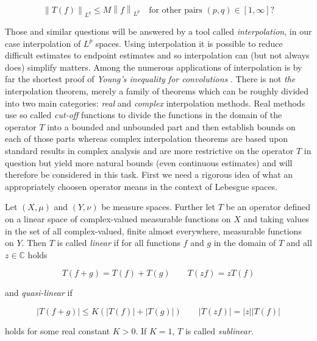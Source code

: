 \begin{equation*}
	\left\| T(f)\right\|_{L^q} \leq M \left\| f\right\|_{L^p} \quad \text{for other pairs $\left( p,q \right) \in [1,\infty]$?} 
\end{equation*}

Those and similar questions will be answered by a tool called \emph{interpolation}, in our case interpolation of $L^p$ spaces. Using interpolation it is possible to reduce difficult estimates to endpoint estimates and so interpolation can (but not always does) simplify matters. Among the numerous applications of interpolation is by far the shortest proof of \emph{Young's inequality for convolutions} \textup{\cite[22--23]{grafakos:fourier:2014}}. There is not \emph{the} interpolation theorem, merely a family of theorems which can be 
roughly divided into two main categories: \emph{real} and \emph{complex} interpolation methods. Real methods use so called \emph{cut-off} functions to divide the functions in the domain of the operator $T$ into a bounded and unbounded part and then establish bounds on each of those parts whereas complex interpolation theorems are based upon standard results in complex analysis and are more restrictive on the operator $T$ in question but yield more natural bounds (even continuous estimates) and will therefore be considered in this task. First we need a rigorous idea of what an appropriately choosen operator means in the context of Lebesgue spaces. 

\vspace{2mm}

\begin{mdframed}
	\begin{definition}
		Let $(X,\mu)$ and $(Y,\nu)$ be measure spaces. Further let $T$ be an operator defined on a linear space of complex-valued measurable functions on $X$ and taking values in the set of all complex-valued, finite almost everywhere, measurable functions on $Y$. Then $T$ is called \emph{linear} if for all functions $f$ and $g$ in the domain of $T$ and all $z \in \mathbb{C}$ holds

		\begin{equation}
			T\left( f + g \right) = T(f) + T(g) \qquad T\left( zf \right) = zT(f)
			\label{eq:linear}
		\end{equation}

		and \emph{quasi-linear} if

		\begin{equation}
			\left| T\left( f + g \right) \right| \leqslant K \left( \left| T(f)\right| + \left| T(g)\right| \right) \qquad \left| T(zf) \right| = \left| z\right| \left| T(f)\right|
			\label{eq:quasilinear}
		\end{equation}

		holds for some real constant $K > 0$. If $K = 1$, $T$ is called \emph{sublinear}.
	\end{definition}
\end{mdframed}

